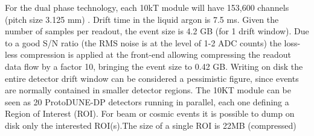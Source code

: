 \begin{itemize}
For the dual phase technology, each 10kT module will have 153,600 channels (pitch size 3.125 mm) . Drift time in the liquid argon is 7.5 ms. Given the number of samples per readout, the event size is 4.2 GB (for 1 drift window).  Due to a good S/N ratio (the RMS noise is at the level of 1-2 ADC counts) the loss-less compression is applied at the front-end allowing compressing the readout data flow by a factor 10, bringing the event size to 0.42 GB. Writing on disk the entire detector drift window can be considered a pessimistic figure, since events are normally contained in smaller detector regions. The 10KT module can be seen as 20 ProtoDUNE-DP  detectors  running in parallel, each one defining a Region of Interest (ROI). For beam or cosmic events it is possible to dump on disk only the interested ROI(s).The size of a single ROI is  22MB (compressed)





%



\end{itemize}
